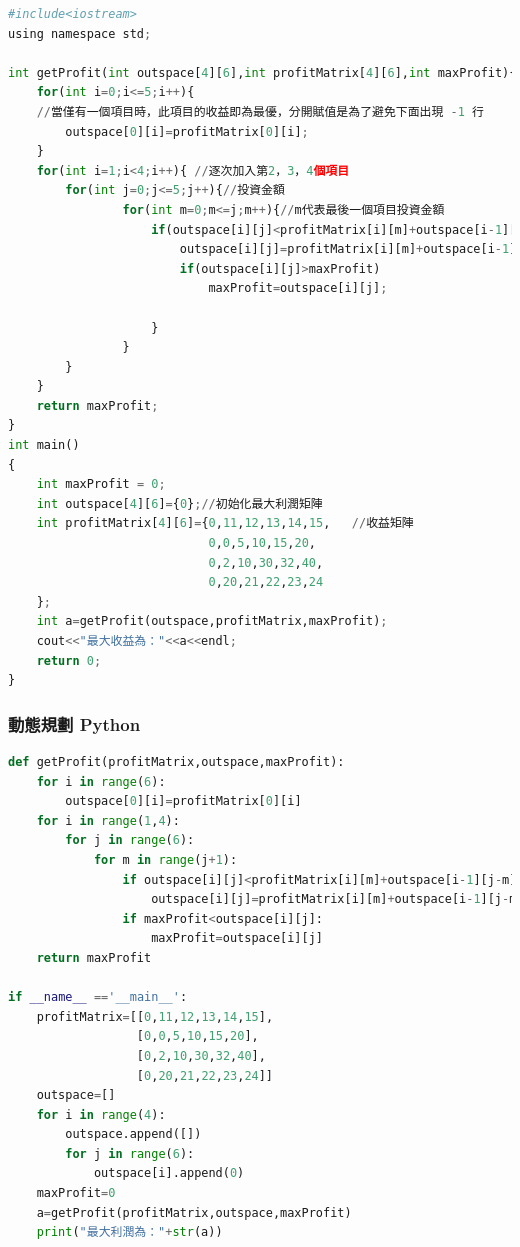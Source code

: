\documentclass[10pt,UTF8]{ctexart}
\begin{document}
\begin{lstlisting}[language={python}]
#include<iostream>
using namespace std;

int getProfit(int outspace[4][6],int profitMatrix[4][6],int maxProfit){
    for(int i=0;i<=5;i++){
    //當僅有一個項目時，此項目的收益即為最優，分開賦值是為了避免下面出現 -1 行
        outspace[0][i]=profitMatrix[0][i];
    }
    for(int i=1;i<4;i++){ //逐次加入第2，3，4個項目
        for(int j=0;j<=5;j++){//投資金額
                for(int m=0;m<=j;m++){//m代表最後一個項目投資金額
                    if(outspace[i][j]<profitMatrix[i][m]+outspace[i-1][j-m]){
                        outspace[i][j]=profitMatrix[i][m]+outspace[i-1][j-m];
                        if(outspace[i][j]>maxProfit)
                            maxProfit=outspace[i][j];

                    }
                }
        }
    }
    return maxProfit;
}
int main()
{
    int maxProfit = 0;
    int outspace[4][6]={0};//初始化最大利潤矩陣
    int profitMatrix[4][6]={0,11,12,13,14,15,   //收益矩陣
                            0,0,5,10,15,20,
                            0,2,10,30,32,40,
                            0,20,21,22,23,24
    };
    int a=getProfit(outspace,profitMatrix,maxProfit);
    cout<<"最大收益為："<<a<<endl;
    return 0;
}
\end{lstlisting}

\subsubsection{動態規劃 Python}

\begin{lstlisting}[language={python}]
def getProfit(profitMatrix,outspace,maxProfit):
    for i in range(6):
        outspace[0][i]=profitMatrix[0][i]
    for i in range(1,4):
        for j in range(6):
            for m in range(j+1):
                if outspace[i][j]<profitMatrix[i][m]+outspace[i-1][j-m]:
                    outspace[i][j]=profitMatrix[i][m]+outspace[i-1][j-m]
                if maxProfit<outspace[i][j]:
                    maxProfit=outspace[i][j]
    return maxProfit
                
if __name__ =='__main__':
    profitMatrix=[[0,11,12,13,14,15],
                  [0,0,5,10,15,20],
                  [0,2,10,30,32,40],
                  [0,20,21,22,23,24]]
    outspace=[]
    for i in range(4):
        outspace.append([])
        for j in range(6):
            outspace[i].append(0)
    maxProfit=0
    a=getProfit(profitMatrix,outspace,maxProfit)
    print("最大利潤為："+str(a))
\end{lstlisting}
\end{document}

